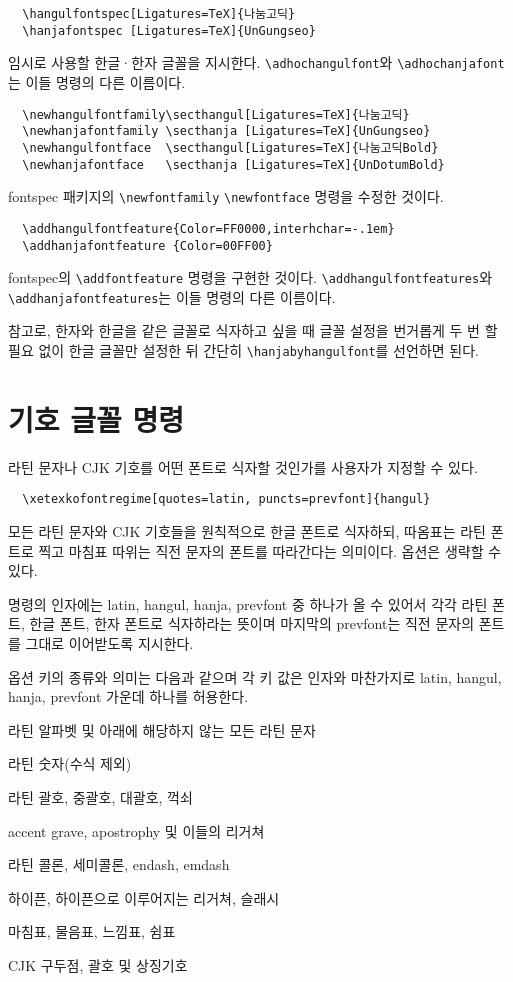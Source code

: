 \documentclass[a4paper]{article}
\def\cs#1{\texttt{\color{blue!50!black}\textbackslash #1}}
\begin{document}
\begin{verbatim}
  \hangulfontspec[Ligatures=TeX]{나눔고딕}
  \hanjafontspec [Ligatures=TeX]{UnGungseo}
\end{verbatim}
임시로 사용할 한글·한자 글꼴을 지시한다.
\cs{adhochangulfont}와 \cs{adhochanjafont}는 이들 명령의 다른 이름이다.

\begin{verbatim}
  \newhangulfontfamily\secthangul[Ligatures=TeX]{나눔고딕}
  \newhanjafontfamily \secthanja [Ligatures=TeX]{UnGungseo}
  \newhangulfontface  \secthangul[Ligatures=TeX]{나눔고딕Bold}
  \newhanjafontface   \secthanja [Ligatures=TeX]{UnDotumBold}
\end{verbatim}
fontspec 패키지의 \verb+\newfontfamily+ \verb+\newfontface+ 명령을
수정한 것이다.

\begin{verbatim}
  \addhangulfontfeature{Color=FF0000,interhchar=-.1em}
  \addhanjafontfeature {Color=00FF00}
\end{verbatim}
fontspec의 \verb+\addfontfeature+ 명령을 구현한 것이다.
\cs{addhangulfontfeatures}와\\ \cs{addhanjafontfeatures}는
이들 명령의 다른 이름이다.

\smallskip
참고로, 한자와 한글을 같은 글꼴로 식자하고 싶을 때 글꼴 설정을
번거롭게 두 번 할 필요 없이 한글 글꼴만 설정한 뒤 간단히
  \cs{hanjabyhangulfont}를 선언하면 된다.

\section{기호 글꼴 명령}
라틴 문자나 CJK 기호를 어떤 폰트로 식자할 것인가를 사용자가 지정할 수 있다.
\begin{verbatim}
  \xetexkofontregime[quotes=latin, puncts=prevfont]{hangul}
\end{verbatim}
모든 라틴 문자와 CJK 기호들을 원칙적으로 한글 폰트로 식자하되,
따옴표는 라틴 폰트로 찍고 마침표 따위는 직전 문자의 폰트를 따라간다는 의미이다.
옵션은 생략할 수 있다.

명령의 인자에는 latin, hangul, hanja, prevfont 중 하나가 올 수 있어서
각각 라틴 폰트, 한글 폰트, 한자 폰트로 식자하라는 뜻이며
마지막의 prevfont는 직전 문자의 폰트를 그대로 이어받도록 지시한다.

옵션 키의 종류와 의미는 다음과 같으며 각 키 값은 인자와 마찬가지로
latin, hangul, hanja, prevfont 가운데 하나를 허용한다.
\begin{description}\itemsep0pt
\item[alphs] 라틴 알파벳 및 아래에 해당하지 않는 모든 라틴 문자
\item[nums] 라틴 숫자(수식 제외)
\item[parens] 라틴 괄호, 중괄호, 대괄호, 꺽쇠
\item[quotes] accent grave, apostrophy 및 이들의 리거쳐
\item[colons] 라틴 콜론, 세미콜론, endash, emdash
\item[hyphens] 하이픈, 하이픈으로 이루어지는 리거쳐, 슬래시
\item[puncts] 마침표, 물음표, 느낌표, 쉼표
\item[cjksymbols] CJK 구두점, 괄호 및 상징기호
\end{description}
\end{document}
